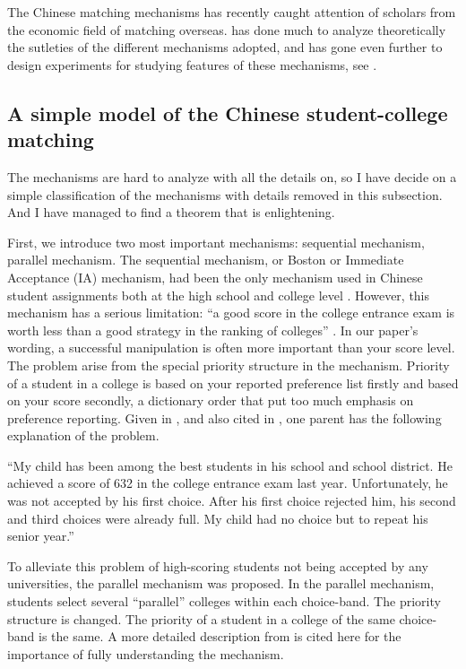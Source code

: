 The Chinese  matching mechanisms has recently caught attention of scholars from
the economic field of matching overseas. \parencite{YanChenJPE} has
done much to analyze theoretically the sutleties of the different
mechanisms adopted, and has gone even further to design experiments
for studying features of these mechanisms,
see \parencite{YanChen2016}. 

\subsection{A simple model of the Chinese student-college matching}



The mechanisms are hard to analyze with all the details on, so I have
decide on a simple classification of the mechanisms with details
removed in this subsection. And I have managed to find a theorem that
is enlightening.

First, we introduce two most important mechanisms: sequential mechanism, parallel mechanism. The sequential mechanism, or Boston or Immediate Acceptance (IA) mechanism,
had been the only mechanism used in Chinese student assignments both at the high school
and college level \parencite{Nie2007b}. However, this mechanism has a serious limitation: “a good score in
the college entrance exam is worth less than a good strategy in the ranking of colleges” \parencite{Nie2007a}. In our paper's wording, a successful manipulation is often more important than your score level. The problem arise from the special priority structure in the mechanism. Priority of a student in a college is based on your reported preference list firstly and based on your score secondly, a dictionary order that put too much emphasis on preference reporting. Given in \parencite{Nie2007b}, and also cited in \parencite{YanChenJPE}, one parent has the following explanation of the problem.

``My child has been among the best students in his school and school district. He
achieved a score of 632 in the college entrance exam last year. Unfortunately, he was
not accepted by his first choice. After his first choice rejected him, his second and third
choices were already full. My child had no choice but to repeat his senior year.''

To alleviate this problem of high-scoring students not being accepted by any universities, the
parallel mechanism was proposed. 
In the parallel mechanism, students select several
“parallel” colleges within each choice-band. The priority structure is changed. The priority of a student in a college of the same choice-band is the same. A more detailed description from \parencite{YanChenJPE} is cited here for the importance of fully understanding the mechanism.

